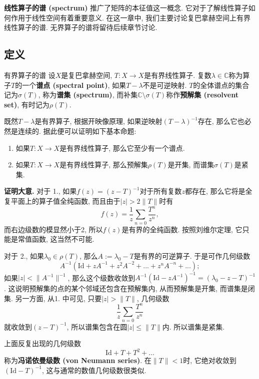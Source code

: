 \textbf{线性算子的谱 (spectrum)} 推广了矩阵的本征值这一概念. 它对于了解线性算子如何作用于线性空间有着重要意义. 在这一章中, 我们主要讨论复巴拿赫空间上有界线性算子的谱. 无界算子的谱将留待后续章节讨论.

\subsection{定义}
\begin{definition}{有界算子的谱}
设$X$是复巴拿赫空间, $T:X\to X$是有界线性算子. 复数$\lambda\in\mathbb{C}$称为算子$T$的一个\textbf{谱点 (spectral point)}, 如果$T-\lambda$不是可逆映射. $T$的全体谱点的集合记为$\sigma(T)$, 称为\textbf{谱集 (spectrum)}, 而补集$\mathbb{C}\setminus\sigma(T)$称作\textbf{预解集 (resolvent set)}, 有时记为$\rho(T)$.
\end{definition}

既然$T-\lambda$是有界算子, 根据开映像原理, 如果逆映射$(T-\lambda)^{-1}$存在, 那么它也必然是连续的. 据此便可以证明如下基本命题:

\begin{theorem}{}
\begin{enumerate}
\item 如果$T:X\to X$是有界线性算子, 那么它至少有一个谱点.
\item 如果$T:X\to X$是有界线性算子, 那么预解集$\rho(T)$是开集, 而谱集$\sigma(T)$是紧集.
\end{enumerate}
\end{theorem}
\textbf{证明大意.} 
对于 1., 如果$f(z)=(z-T)^{-1}$对于所有复数$z$都存在, 那么它将是全复平面上的算子值全纯函数, 而且由于$|z|>2\|T\|$时有
$$
f(z)=\frac{1}{z}\sum_{n=0}\frac{T^n}{z^n},
$$
而右边级数的模显然小于2, 所以$f(z)$是有界的全纯函数. 按照刘维尔定理, 它只能是常值函数, 这当然不可能.

对于 2., 如果$\lambda_0\in\rho(T)$, 那么$A:=\lambda_0-T$是有界的可逆算子. 于是可作几何级数
$$
A^{-1}(\text{Id}+zA^{-1}+z^2A^{-2}+...+z^nA^{-n}+...);
$$
如果$|z|<\|A^{-1}\|^{-1}$, 那么这个级数收敛到$A^{-1}(\text{Id}-zA^{-1})^{-1}=(\lambda_0-z-T)^{-1}$. 这说明预解集的点的某个邻域还包含在预解集内, 从而预解集是开集, 而谱集是闭集. 另一方面, 从1. 中可见, 只要$|z|>\|T\|$, 几何级数
$$
\frac{1}{z}\sum_{n=0}\frac{T^n}{z^n}
$$
就收敛到$(z-T)^{-1}$, 所以谱集包含在圆$|z|\leq\|T\|$内. 所以谱集是紧集.

上面反复出现的几何级数
$$
\text{Id}+T+T^2+...
$$
称为\textbf{冯诺依曼级数 (von Neumann series)}. 在$\|T\|<1$时, 它绝对收敛到$(\text{Id}-T)^{-1}$, 这与通常的数值几何级数很类似.